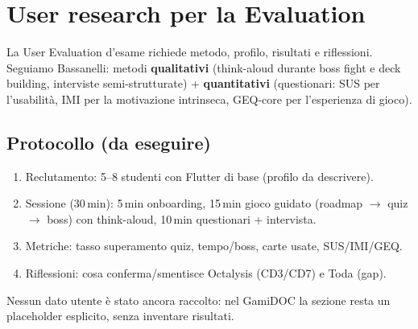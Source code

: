 \chapter{User research per la Evaluation}
\label{ch:userresearch}
La User Evaluation d'esame richiede metodo, profilo, risultati e riflessioni.
Seguiamo Bassanelli: metodi \textbf{qualitativi} (think-aloud durante boss
fight e deck building, interviste semi-strutturate) + \textbf{quantitativi}
(questionari: SUS per l'usabilità, IMI per la motivazione intrinseca,
GEQ-core per l'esperienza di gioco).

\section{Protocollo (da eseguire)}
\begin{enumerate}[nosep]
\item Reclutamento: 5--8 studenti con Flutter di base (profilo da descrivere).
\item Sessione (30\,min): 5\,min onboarding, 15\,min gioco guidato
(roadmap $\rightarrow$ quiz $\rightarrow$ boss) con think-aloud,
10\,min questionari + intervista.
\item Metriche: tasso superamento quiz, tempo/boss, carte usate, SUS/IMI/GEQ.
\item Riflessioni: cosa conferma/smentisce Octalysis (CD3/CD7) e Toda (gap).
\end{enumerate}
Nessun dato utente è stato ancora raccolto: nel GamiDOC la sezione resta un
placeholder esplicito, senza inventare risultati.
